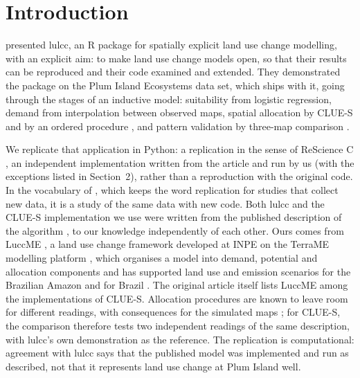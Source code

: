 
\section{Introduction}

\citet{Moulds:2015} presented lulcc, an R package for spatially explicit land use
change modelling, with an explicit aim: to make land use change models open, so that
their results can be reproduced and their code examined and extended. They
demonstrated the package on the Plum Island Ecosystems data set, which ships with
it, going through the stages of an inductive model: suitability from logistic
regression, demand from interpolation between observed maps, spatial allocation by
CLUE-S \supercite{Verburg:2002} and by an ordered procedure \supercite{Fuchs:2013},
and pattern validation by three-map comparison \supercite{Pontius:2011}.

We replicate that application in Python: a replication in the sense of ReScience C
\supercite{Rougier:2017}, an independent implementation written from the article and run by us (with the
exceptions listed in Section~2), rather than a reproduction with the original code. In the vocabulary of
\citet{NASEM:2019}, which keeps the word replication for studies that collect new data,
it is a study of the same data with new code. Both lulcc and the CLUE-S implementation we use were written from the
published description of the algorithm \supercite{Verburg:2002}, to our knowledge independently of each other. Ours comes from LuccME \supercite{Aguiar:2012}, a land use change framework
developed at INPE on the TerraME modelling platform \supercite{Carneiro:2013}, which
organises a model into demand, potential and allocation components and has supported
land use and emission scenarios for the Brazilian Amazon \supercite{Aguiar:2016} and
for Brazil \supercite{Bezerra:2022}. The original article itself lists LuccME among
the implementations of CLUE-S. Allocation procedures are known to leave room for
different readings, with consequences for the simulated maps \supercite{Mazy:2023};
for CLUE-S, the comparison therefore tests two independent readings of the same
description, with lulcc's own demonstration as the reference. The replication is
computational: agreement with lulcc says that the published model was implemented and run
as described, not that it represents land use change at Plum Island well.


